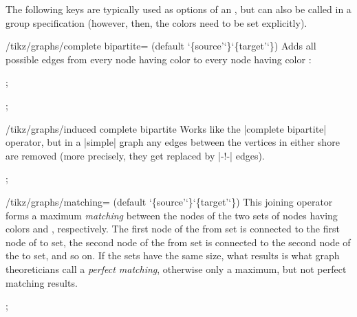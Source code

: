 The following keys are typically used as options of an , but can also be called in a group specification (however, then,
the colors need to be set explicitly).

\begin{key}{/tikz/graphs/complete bipartite= (default \char`\{source'\char`\}\char`\{target'\char`\})}
    Adds all possible edges from every node having color  to
    every node having color :
\begin{codeexample}[preamble={\usetikzlibrary{graphs}}]
\tikz {};
\end{codeexample}
\begin{codeexample}[preamble={\usetikzlibrary{graphs}}]
\tikz {};
\end{codeexample}
\end{key}

\begin{key}{/tikz/graphs/induced complete bipartite}
    Works like the |complete bipartite| operator, but in a |simple| graph any
    edges between the vertices in either shore are removed (more precisely,
    they get replaced by |-!-| edges).
\begin{codeexample}[preamble={\usetikzlibrary{graphs.standard}}]
\tikz {};
\end{codeexample}
\end{key}

\begin{key}{/tikz/graphs/matching= (default \char`\{source'\char`\}\char`\{target'\char`\})}
    This joining operator forms a maximum \emph{matching} between the nodes of
    the two sets of nodes having colors  and ,
    respectively. The first node of the from set is connected to the first node
    of to set, the second node of the from set is connected to the second node
    of the to set, and so on. If the sets have the same size, what results is
    what graph theoreticians call a \emph{perfect matching}, otherwise only a
    maximum, but not perfect matching results.
\begin{codeexample}[preamble={\usetikzlibrary{graphs}}]
\tikz {};
\end{codeexample}
\end{key}


